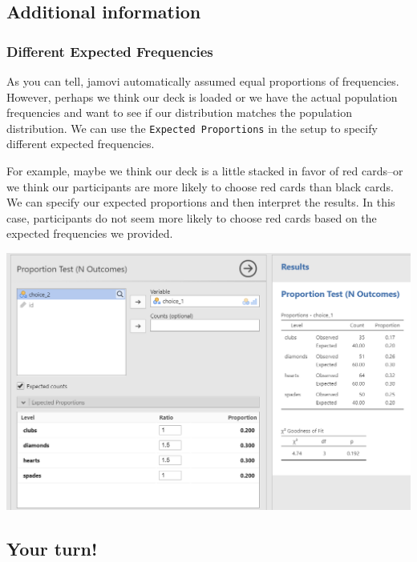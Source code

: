 \documentclass[
]{book}
\begin{document}
\hypertarget{additional-information-1}{%
\subsection{Additional information}\label{additional-information-1}}

\hypertarget{different-expected-frequencies}{%
\subsubsection{Different Expected Frequencies}\label{different-expected-frequencies}}

As you can tell, jamovi automatically assumed equal proportions of frequencies. However, perhaps we think our deck is loaded or we have the actual population frequencies and want to see if our distribution matches the population distribution. We can use the \texttt{Expected\ Proportions} in the setup to specify different expected frequencies.

For example, maybe we think our deck is a little stacked in favor of red cards--or we think our participants are more likely to choose red cards than black cards. We can specify our expected proportions and then interpret the results. In this case, participants do not seem more likely to choose red cards based on the expected frequencies we provided.

\includegraphics{images/09-chi-square/chi-square_results2.png}

\hypertarget{your-turn-3}{%
\subsection{Your turn!}\label{your-turn-3}}
\end{document}
